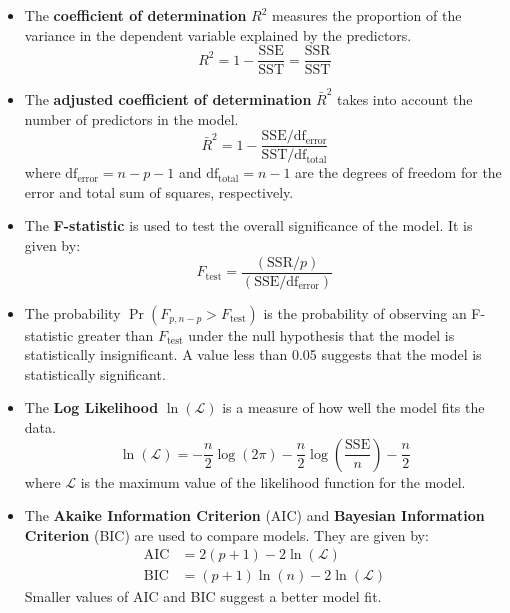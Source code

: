 \documentclass{article}
\begin{document}
\begin{itemize}
    \item The \textbf{coefficient of determination} \(R^2\) measures
          the proportion of the variance in the dependent variable
          explained by the predictors.
          \begin{equation*}
              R^2 = 1 - \frac{\mathrm{SSE}}{\mathrm{SST}} = \frac{\mathrm{SSR}}{\mathrm{SST}}
          \end{equation*}
    \item The \textbf{adjusted coefficient of determination}
          \(\bar{R}^2\) takes into account the number of predictors in
          the model.
          \begin{equation*}
              \bar{R}^2 = 1 - \frac{\mathrm{SSE} / \mathrm{df}_{\mathrm{error}} }{\mathrm{SST} / \mathrm{df}_{\mathrm{total}}}
          \end{equation*}
          where \(\mathrm{df}_{\mathrm{error}} = n - p - 1\) and
          \(\mathrm{df}_{\mathrm{total}} = n - 1\) are the degrees of freedom
          for the error and total sum of squares, respectively.
    \item The \textbf{F-statistic} is used to test the overall
          significance of the model. It is given by:
          \begin{equation*}
              F_{\mathrm{test}} = \frac{\left( \mathrm{SSR} / p \right)}{\left( \mathrm{SSE} / \mathrm{df}_{\mathrm{error}} \right)}
          \end{equation*}
    \item The probability \(\Pr{\left( F_{p, n - p} > F_{\mathrm{test}}
          \right)}\) is the probability of observing an F-statistic
          greater than \(F_{\mathrm{test}}\) under the null hypothesis
          that the model is statistically insignificant. A value less
          than 0.05 suggests that the model is statistically
          significant.
    \item The \textbf{Log Likelihood} \(\ln{\left( \mathcal{L}
          \right)}\) is a measure of how well the model fits the data.
          \begin{equation*}
              \ln{\left( \mathcal{L} \right)} = -\frac{n}{2} \log{\left( 2 \pi \right)} - \frac{n}{2} \log{\left( \frac{\mathrm{SSE}}{n} \right)} - \frac{n}{2}
          \end{equation*}
          where \(\mathcal{L}\) is the maximum value of the likelihood
          function for the model.
    \item The \textbf{Akaike Information Criterion} (AIC) and
          \textbf{Bayesian Information Criterion} (BIC) are used to
          compare models. They are given by:
          \begin{align*}
              \mathrm{AIC} & = 2\left( p + 1 \right) - 2 \ln{\left( \mathcal{L} \right)}                      \\
              \mathrm{BIC} & = \left( p + 1 \right) \ln{\left( n \right)} - 2 \ln{\left( \mathcal{L} \right)}
          \end{align*}
          Smaller values of AIC and BIC suggest a better model fit.
\end{itemize}
\end{document}
